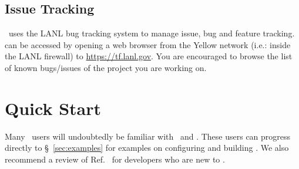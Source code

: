 \subsection{Issue Tracking}
\draco\ uses the LANL  bug tracking system to manage issue, bug and feature tracking.  can be accessed by opening a web browser from the Yellow network (i.e.: inside the LANL firewall) to \url{https://tf.lanl.gov}. You are encouraged to browse the list of known bugs/issues of the project you are working on.


\section{Quick Start}
\label{sec:quick}

Many \draco\ users will undoubtedly be familiar with \cmake\ and
\make. These users can progress directly to \S~\ref{sec:examples} for 
examples on configuring and building \draco. We also recommend a review of Ref.~\cite{ccs2:12-16} for developers who are new to \draco.

